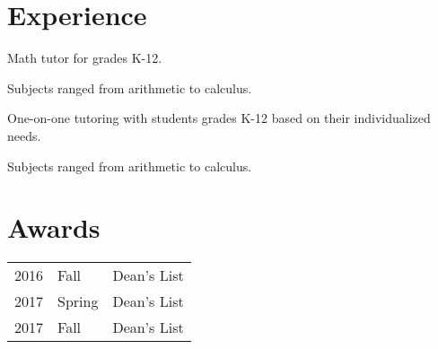 \documentclass[letterpaper]{deedy-resume} %
\begin{document}
\begin{minipage}[t]{0.66\textwidth}
		
		\section{Experience}
		
		
		\vspace{\topsep} %
		\begin{tightitemize}
			\item Math tutor for grades K-12.
			\item Subjects ranged from arithmetic to calculus.
		\end{tightitemize}
		
		\sectionspace %
		
		
		\vspace{\topsep} %
		\begin{tightitemize}
			\item One-on-one tutoring with students grades K-12 based on their individualized needs.
			\item Subjects ranged from arithmetic to calculus.
		\end{tightitemize}
		
		\sectionspace %
		
		
		
		
		\sectionspace %
		
		
		
		\section{Awards} 
		
		\begin{tabular}{rll}
			2016	& Fall	& Dean's List\\
			2017	& Spring& Dean's List\\
			2017	& Fall	& Dean's List
		\end{tabular}
		
		\sectionspace %
		
		
	\end{minipage} %
	
\end{document}
